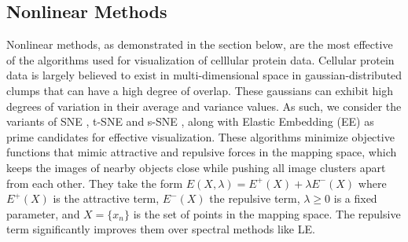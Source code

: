 \documentclass{article}
\begin{document}
\subsection{Nonlinear Methods}
Nonlinear methods, as demonstrated in the section below, are the most effective of the algorithms used for visualization of celllular protein data. Cellular protein data is largely believed to exist in multi-dimensional space in gaussian-distributed clumps that can have a high degree of overlap. These gaussians can exhibit high degrees of variation in their average and variance values. As such, we consider the variants of SNE \cite{Hinton:2002vs}, t-SNE \cite{VanderMaaten:2008tm} and s-SNE \cite{Cook:2007tb}, along with Elastic Embedding (EE) \cite{CarreiraPerpinan:2010tx} as prime candidates for effective visualization. These algorithms minimize objective functions that mimic attractive and repulsive forces in the mapping space, which keeps the images of nearby objects close while pushing all image clusters apart from each other. They take the form $E(X, \lambda) = E^+(X) + \lambda E^-(X)$ where $E^+(X)$ is the attractive term, $E^-(X)$ the repulsive term, $\lambda \geq 0$ is a fixed parameter, and $X = \{x_n\}$ is the set of points in the mapping space. The repulsive term significantly improves them over spectral methods like LE. 
\end{document}
